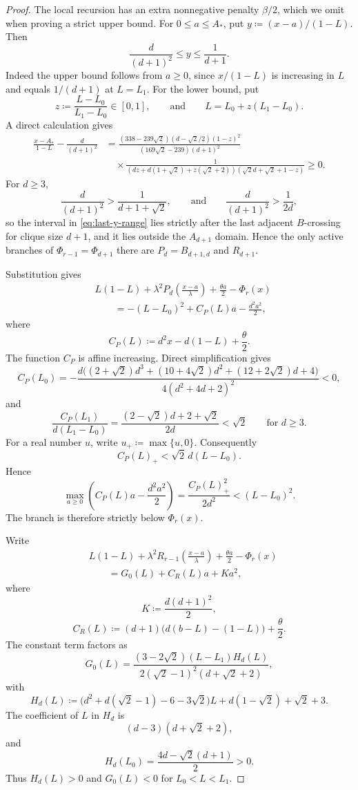 \documentclass[10pt]{article}
\numberwithin{equation}{section}
\begin{document}
\begin{proof}
The local recursion has an extra nonnegative penalty $\beta/2$, which we omit when proving a strict upper bound.  For $0\le a\le A_*$, put $y\coloneqq(x-a)/(1-L)$.  Then
\begin{equation}\label{eq:last-y-range}
 \frac{d}{(d+1)^2}\le y\le\frac1{d+1}.
\end{equation}
Indeed the upper bound follows from $a\ge0$, since $x/(1-L)$ is increasing in $L$ and equals $1/(d+1)$ at $L=L_1$.  For the lower bound, put
\[
 z\coloneqq\frac{L-L_0}{L_1-L_0}\in[0,1],
 \qquad\text{and}\qquad
 L=L_0+z(L_1-L_0).
\]
A direct calculation gives
\begin{align*}
 \frac{x-A_*}{1-L}-\frac{d}{(d+1)^2}
 &=\frac{(338-239\sqrt2)(d-\sqrt2/2)(1-z)^2}
 {(169\sqrt2-239)(d+1)^2}\\
 &\quad\times
 \frac1{(dz+d(1+\sqrt2)+z(\sqrt2+2))
  (\sqrt2 d+\sqrt2+1-z)}\ge0.
\end{align*}
For $d\ge3$,
\[
 \frac{d}{(d+1)^2}>\frac1{d+1+\sqrt2},
 \qquad\text{and}\qquad
 \frac{d}{(d+1)^2}>\frac1{2d},
\]
so the interval in \cref{eq:last-y-range} lies strictly after the last adjacent $B$-crossing for clique size $d+1$, and it lies outside the $A_{d+1}$ domain.  Hence the only active branches of $\Phi_{r-1}=\Phi_{d+1}$ there are $P_d=B_{d+1,d}$ and $R_{d+1}$.

Substitution gives
\[
 \begin{aligned}
 &L(1-L)+\lambda^2P_d\left(\frac{x-a}{\lambda}\right)
 +\frac{\theta a}{2}-\Phi_r(x)\\
 &\qquad=-(L-L_0)^2+C_P(L)a-\frac{d^2a^2}{2},
 \end{aligned}
\]
where
\[
 C_P(L)\coloneqq d^2x-d(1-L)+\frac\theta2.
\]
The function $C_P$ is affine increasing.  Direct simplification gives
\[
 C_P(L_0)=
 -\frac{d\bigl((2+\sqrt2)d^3+(10+4\sqrt2)d^2
 +(12+2\sqrt2)d+4\bigr)}{4(d^2+4d+2)^2}<0,
\]
and
\[
 \frac{C_P(L_1)}{d(L_1-L_0)}
 =\frac{(2-\sqrt2)d+2+\sqrt2}{2d}<\sqrt2
 \qquad\text{for }d\ge3.
\]
For a real number $u$, write $u_+\coloneqq\max\{u,0\}$.  Consequently
\[
 C_P(L)_+<\sqrt2\,d(L-L_0).
\]
Hence
\[
 \max_{a\ge0}\left(C_P(L)a-\frac{d^2a^2}{2}\right)
 =\frac{C_P(L)_+^2}{2d^2}
 <(L-L_0)^2.
\]
The branch is therefore strictly below $\Phi_r(x)$.

Write
\[
 \begin{aligned}
 &L(1-L)+\lambda^2R_{r-1}\left(\frac{x-a}{\lambda}\right)
 +\frac{\theta a}{2}-\Phi_r(x)\\
 &\qquad=G_0(L)+C_R(L)a+Ka^2,
 \end{aligned}
\]
where
\[
 K\coloneqq\frac{d(d+1)^2}{2},
\]
\[
 C_R(L)\coloneqq(d+1)\bigl(d(b-L)-(1-L)\bigr)+\frac\theta2.
\]
The constant term factors as
\[
 G_0(L)=
 \frac{(3-2\sqrt2)(L-L_1)H_d(L)}
 {2(\sqrt2-1)^2(d+\sqrt2+2)},
\]
with
\[
 H_d(L)\coloneqq\bigl(d^2+d(\sqrt2-1)-6-3\sqrt2\bigr)L
 +d(1-\sqrt2)+\sqrt2+3.
\]
The coefficient of $L$ in $H_d$ is
\[
 (d-3)(d+\sqrt2+2),
\]
and
\[
 H_d(L_0)=\frac{4d-\sqrt2(d+1)}2>0.
\]
Thus $H_d(L)>0$ and $G_0(L)<0$ for $L_0<L<L_1$.


\end{proof}
\end{document}
